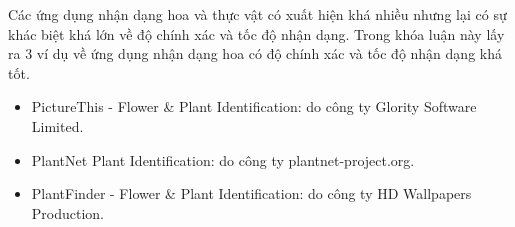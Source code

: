 \documentclass[12pt]{report}
\begin{document}
		Các ứng dụng nhận dạng hoa và thực vật có xuất hiện khá nhiều nhưng lại có sự khác biệt khá lớn về độ chính xác và tốc độ nhận dạng. Trong khóa luận này lấy ra 3 ví dụ về ứng dụng nhận dạng hoa có độ chính xác và tốc độ nhận dạng khá tốt.
																
																		
																
		\begin{itemize}
			\item PictureThis - Flower \& Plant Identification: do công ty Glority Software Limited.	
			\item PlantNet Plant Identification: do công ty plantnet-project.org.
			\item PlantFinder - Flower \& Plant Identification: do công ty HD Wallpapers Production. 		
		\end{itemize}
																
\end{document}
